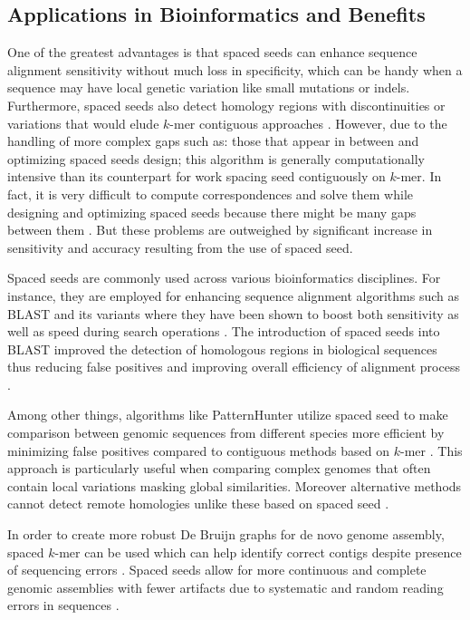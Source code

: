 	\subsection{Applications in Bioinformatics and Benefits}
	\label{subsec:spacedKmer-application-and-benefits}
	
	One of the greatest advantages is that spaced seeds can enhance sequence alignment sensitivity without much loss in specificity, which can be handy when a sequence may have local genetic variation like small mutations or indels. Furthermore, spaced seeds also detect homology regions with discontinuities or variations that would elude $k$-mer contiguous approaches \cite{mak2006improvements}. However, due to the handling of more complex gaps such as: those that appear in between and optimizing spaced seeds design; this algorithm is generally computationally intensive than its counterpart for work spacing seed contiguously on $k$-mer. In fact, it is very difficult to compute correspondences and solve them while designing and optimizing spaced seeds because there might be many gaps between them \cite{chumakov2012bioinformatics}. But these problems are outweighed by significant increase in sensitivity and accuracy resulting from the use of spaced seed.
	
	Spaced seeds are commonly used across various bioinformatics disciplines. For instance, they are employed for enhancing sequence alignment algorithms such as BLAST and its variants where they have been shown to boost both sensitivity as well as speed during search operations \cite{bin2002patternhunter,li2004patternhunter}. The introduction of spaced seeds into BLAST improved the detection of homologous regions in biological sequences thus reducing false positives and improving overall efficiency of alignment process \cite{camacho2009blast+}.
	
	Among other things, algorithms like PatternHunter utilize spaced seed to make comparison between genomic sequences from different species more efficient by minimizing false positives compared to contiguous methods based on $k$-mer \cite{li2004patternhunter}. This approach is particularly useful when comparing complex genomes that often contain local variations masking global similarities. Moreover alternative methods cannot detect remote homologies unlike these based on spaced seed \cite{sun2005enhanced}.
	
	In order to create more robust De Bruijn graphs for de novo genome assembly, spaced $k$-mer can be used which can help identify correct contigs despite presence of sequencing errors \cite{nagarajan2009parametric}. Spaced seeds allow for more continuous and complete genomic assemblies with fewer artifacts due to systematic and random reading errors in sequences \cite{paten2011genome}.
	
